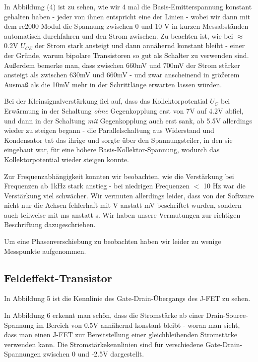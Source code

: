 \documentclass[12pt,a4paper,twopage]{article}
\begin{document}
In Abbildung (4) ist zu sehen, wie wir 4 mal die Basis-Emitterspannung konstant gehalten haben - jeder von ihnen entspricht eine der Linien - wobei wir dann mit dem rc2000 Modul die Spannung zwischen 0 und 10 V in kurzen Messabständen automatisch durchfahren und den Strom zwischen. Zu beachten ist, wie bei $\approx$0.2V $U_{CE}$ der Strom stark ansteigt und dann annähernd konstant bleibt - einer der Gründe, warum bipolare Transistoren so gut als Schalter zu verwenden sind. Außerdem bemerke man, dass zwischen 660mV und 700mV der Strom stärker ansteigt als zwischen 630mV und 660mV - und zwar anscheinend in größerem Ausmaß als die 10mV mehr in der Schrittlänge erwarten lassen würden.

Bei der Kleinsignalverstärkung fiel auf, dass das Kollektorpotential $U_{C}$ bei Erwärmung in der Schaltung \textit{ohne} Gegenkopplung erst von 7V auf 4.2V abfiel, und dann in der Schaltung \textit{mit} Gegenkopplung auch erst sank, ab 5.5V allerdings wieder zu steigen begann - die Parallelschaltung aus Widerstand und Kondensator tat das ihrige und sorgte über den Spannungsteiler, in den sie eingebaut war, für eine höhere Basis-Kollektor-Spannung, wodurch das Kollektorpotential wieder steigen konnte.

Zur Frequenzabhängigkeit konnten wir beobachten, wie die Verstärkung bei Frequenzen ab 1kHz stark anstieg -  bei niedrigen Frequenzen $<$ 10 Hz war die Verstärkung viel schwächer. Wir vermuten allerdings leider, dass von der Software nicht nur die Achsen fehlerhaft mit V anstatt mV beschriftet wurden, sondern auch teilweise mit ms anstatt s. Wir haben unsere Vermutungen zur richtigen Beschriftung dazugeschrieben.

Um eine Phasenverschiebung zu beobachten haben wir leider zu wenige Messpunkte aufgenommen.


\subsection{Feldeffekt-Transistor}
In Abbildung 5 ist die Kennlinie des Gate-Drain-Übergangs des J-FET zu sehen.

In Abbildung 6 erkennt man schön, dass die Stromstärke ab einer Drain-Source-Spannung im Bereich von 0.5V annähernd konstant bleibt - woran man sieht, dass man einen J-FET zur Bereitstellung einer gleichbleibenden Stromstärke verwenden kann. Die Stromstärkekennlinien sind für verschiedene Gate-Drain-Spannungen zwischen 0 und -2.5V dargestellt.

						
\end{document}
